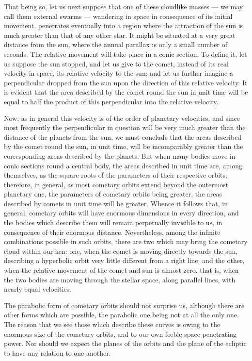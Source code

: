 \documentclass[a4paper, 12pt, oneside, polutonikogreek, english]{article}
\begin{document}
That being so, let us next suppose that one of these cloudlike masses --- we may call them external swarms --- wandering in space in consequence of its initial movement, penetrates eventually into a region where the attraction of the sun is much greater than that of any other star. It might be situated at a very great distance from the sun, where the annual parallax is only a small number of seconds. The relative movement will take place in a conic section. To define it, let us suppose the sun stopped, and let us give to the comet, instead of its real velocity in space, its relative velocity to the sun; and let us further imagine a perpendicular dropped from the sun upon the direction of this relative velocity. It is evident that the area described by the comet round the sun in unit time will be equal to half the product of this perpendicular into the relative velocity.

Now, as in general this velocity is of the order of planetary velocities, and since most frequently the perpendicular in question will be very much greater than the distance of the planets from the sun, we must conclude that the areas described by the comet round the sun, in unit time, will be incomparably greater than the corresponding areas described by the planets. But when many bodies move in conic sections round a central body, the areas described in unit time are, among themselves, as the square roots of the parameters of their respective orbits; therefore, in general, as most cometary orbits extend beyond the outermost planetary one, the parameters of cometary orbits being greater, the areas described by comets in unit time will be greater. Whence it follows that, in general, cometary orbits will have enormous dimensions in every direction, and the bodies which describe them will remain perpetually invisible to us, in consequence of their enormous distance. Nevertheless, among the infinite combinations possible in such orbits, there are two which may bring the cometary cloud within our ken: one, when the comet is moving directly towards the sun, describing a hyperbolic orbit very little different from a right line; and the other, when the relative movement of the comet and sun is almost zero, that is, when the two bodies are moving through the stellar space, along parallel lines, with nearly equal velocities.

The parabolic form of cometary orbits should not surprise us, although there are other forms which are possible, the parabolic one being not at all the only one. The reason that we see those which describe these curves is owing to the enormous size of the cometary orbits, and to our own feeble space penetrating power. Nor should we expect the planes of the orbits and the plane of the ecliptic to have any relation to one another.
\end{document}
